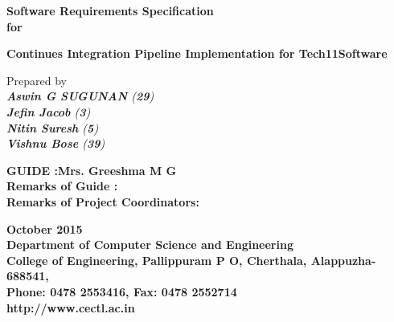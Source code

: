 \documentclass[12pt,a4paper,oneside]{report}
\begin{document}
\renewcommand\bibname{References}
\begin{titlepage}
\begin{center}
\LARGE{\textbf{Software Requirements Specification}}\\
\Large{\textbf{for}}\\

\begin{singlespace}
\LARGE{\textbf{Continues Integration Pipeline Implementation for Tech11Software}}\\
\end{singlespace}
\Large{{Prepared by  }}\\
\Large{\textit{\textbf{Aswin G SUGUNAN}     (\textbf{29})}}\\
\Large{\textit{\textbf{Jefin Jacob}    (\textbf{3})}}\\
\Large{\textit{\textbf{Nitin Suresh}   (\textbf{5})}}\\
\Large{\textit{\textbf{Vishnu Bose}   (\textbf{39})}}\\

\begin{singlespace}
\begin{flushleft}

\vspace{0.1in}
\small\textbf{{GUIDE :Mrs. Greeshma M G}}\\
\vspace{0.1in}
\small{\textbf{Remarks of  Guide :}}\\
\vspace{0.6in}
\small{\textbf{Remarks of Project Coordinators:}}\\

\end{flushleft}
\end{singlespace}


\vspace{0.1in}

\begin{figure}[h]
\begin{center}
\end{center}
\end{figure}
\begin{singlespace}
\small{\textbf{October 2015\\Department of Computer Science and Engineering\\College of Engineering, Pallippuram P O, Cherthala, Alappuzha-688541, \\Phone: 0478 2553416, Fax: 0478 2552714\\http://www.cectl.ac.in}}
\end{singlespace}
\end{center}
\end{titlepage}
\end{document}

